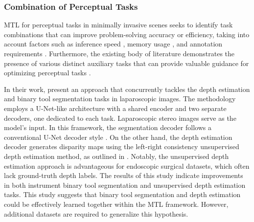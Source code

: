 \subsubsection{Combination of Perceptual Tasks}
MTL for perceptual tasks in minimally invasive scenes seeks to identify task combinations that can improve problem-solving accuracy \citep{simultaneous_depth_tool_seg,islam2020apmtl,scalable_joint_detection,multi_contour,multi_HOG,landmark_detection_submucosal} or efficiency, taking into account factors such as inference speed \citep{scalable_joint_detection,islam2020apmtl}, memory usage \citep{scalable_joint_detection,islam2020apmtl}, and annotation requirements \citep{scalable_joint_detection}. Furthermore, the existing body of literature demonstrates the presence of various distinct auxiliary tasks that can provide valuable guidance for optimizing perceptual tasks \citep{multi_contour,multi_HOG,landmark_detection_submucosal}.



In their work, \citet{simultaneous_depth_tool_seg} present an approach that concurrently tackles the depth estimation and binary tool segmentation tasks in laparoscopic images. The methodology employs a U-Net-like architecture with a shared encoder and two separate decoders, one dedicated to each task. Laparoscopic stereo images serve as the model's input.
In this framework, the segmentation decoder follows a conventional U-Net decoder style \citep{unet}. On the other hand, the depth estimation decoder generates disparity maps using the left-right consistency unsupervised depth estimation method, as outlined in \citet{monodepth17}. Notably, the unsupervised depth estimation approach is advantageous for endoscopic surgical datasets, which often lack ground-truth depth labels.
The results of this study indicate improvements in both instrument binary tool segmentation and unsupervised depth estimation tasks. This study suggests that binary tool segmentation and depth estimation could be effectively learned together within the MTL framework. However, additional datasets are required to generalize this hypothesis.



